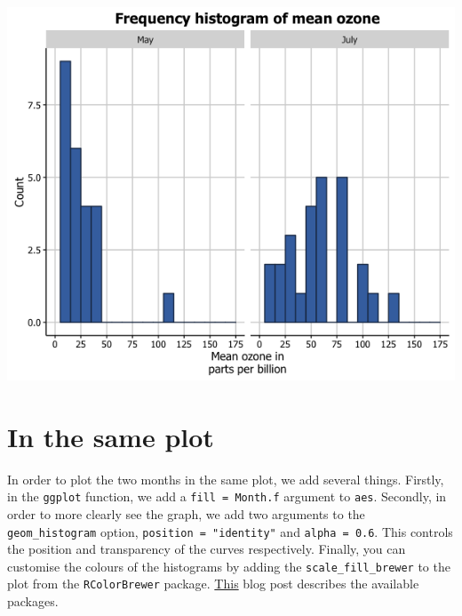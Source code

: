 \begin{center}\includegraphics[width=0.55\linewidth]{0_all_posts_pdf/histogram_18-1} \end{center}

\section{In the same plot}\label{in-the-same-plot}

In order to plot the two months in the same plot, we add several things.
Firstly, in the \texttt{ggplot} function, we add a
\texttt{fill\ =\ Month.f} argument to \texttt{aes}. Secondly, in order
to more clearly see the graph, we add two arguments to the
\texttt{geom\_histogram} option, \texttt{position\ =\ "identity"} and
\texttt{alpha\ =\ 0.6}. This controls the position and transparency of
the curves respectively. Finally, you can customise the colours of the
histograms by adding the \texttt{scale\_fill\_brewer} to the plot from
the \texttt{RColorBrewer} package.
\href{http://moderndata.plot.ly/create-colorful-graphs-in-r-with-rcolorbrewer-and-plotly/}{This}
blog post describes the available packages.

